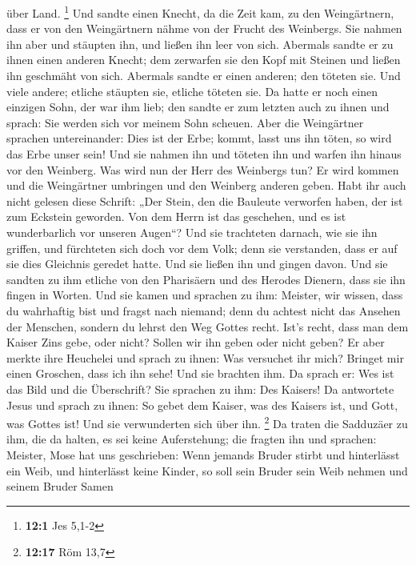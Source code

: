 über Land. \footnote{\textbf{12:1} Jes 5,1-2}  Und sandte
einen Knecht, da die Zeit kam, zu den Weingärtnern, dass er von den
Weingärtnern nähme von der Frucht des Weinbergs.  Sie nahmen
ihn aber und stäupten ihn, und ließen ihn leer von sich. 
Abermals sandte er zu ihnen einen anderen Knecht; dem zerwarfen sie den
Kopf mit Steinen und ließen ihn geschmäht von sich. 
Abermals sandte er einen anderen; den töteten sie. Und viele andere;
etliche stäupten sie, etliche töteten sie.  Da hatte er noch
einen einzigen Sohn, der war ihm lieb; den sandte er zum letzten auch zu
ihnen und sprach: Sie werden sich vor meinem Sohn scheuen. 
Aber die Weingärtner sprachen untereinander: Dies ist der Erbe; kommt,
lasst uns ihn töten, so wird das Erbe unser sein!  Und sie
nahmen ihn und töteten ihn und warfen ihn hinaus vor den Weinberg.
 Was wird nun der Herr des Weinbergs tun? Er wird kommen und
die Weingärtner umbringen und den Weinberg anderen geben. 
Habt ihr auch nicht gelesen diese Schrift: „Der Stein, den die Bauleute
verworfen haben, der ist zum Eckstein geworden.  Von dem
Herrn ist das geschehen, und es ist wunderbarlich vor unseren Augen``?
 Und sie trachteten darnach, wie sie ihn griffen, und
fürchteten sich doch vor dem Volk; denn sie verstanden, dass er auf sie
dies Gleichnis geredet hatte. Und sie ließen ihn und gingen davon.
 Und sie sandten zu ihm etliche von den Pharisäern und des
Herodes Dienern, dass sie ihn fingen in Worten.  Und sie
kamen und sprachen zu ihm: Meister, wir wissen, dass du wahrhaftig bist
und fragst nach niemand; denn du achtest nicht das Ansehen der Menschen,
sondern du lehrst den Weg Gottes recht. Ist's recht, dass man dem Kaiser
Zins gebe, oder nicht? Sollen wir ihn geben oder nicht geben?
 Er aber merkte ihre Heuchelei und sprach zu ihnen: Was
versuchet ihr mich? Bringet mir einen Groschen, dass ich ihn sehe!
 Und sie brachten ihm. Da sprach er: Wes ist das Bild und
die Überschrift? Sie sprachen zu ihm: Des Kaisers!  Da
antwortete Jesus und sprach zu ihnen: So gebet dem Kaiser, was des
Kaisers ist, und Gott, was Gottes ist! Und sie verwunderten sich über
ihn. \footnote{\textbf{12:17} Röm 13,7}  Da traten die
Sadduzäer zu ihm, die da halten, es sei keine Auferstehung; die fragten
ihn und sprachen:  Meister, Mose hat uns geschrieben: Wenn
jemands Bruder stirbt und hinterlässt ein Weib, und hinterlässt keine
Kinder, so soll sein Bruder sein Weib nehmen und seinem Bruder Samen
